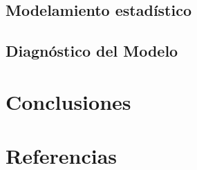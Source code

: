 \documentclass[11pt,twoside]{article}\usepackage[]{graphicx}\usepackage[]{color}
\begin{document}
\subsection{Modelamiento estadístico}

\subsection{Diagnóstico del Modelo}
\section{Conclusiones}
\section{Referencias}
\begin{description}
\end{description}
\end{document}
